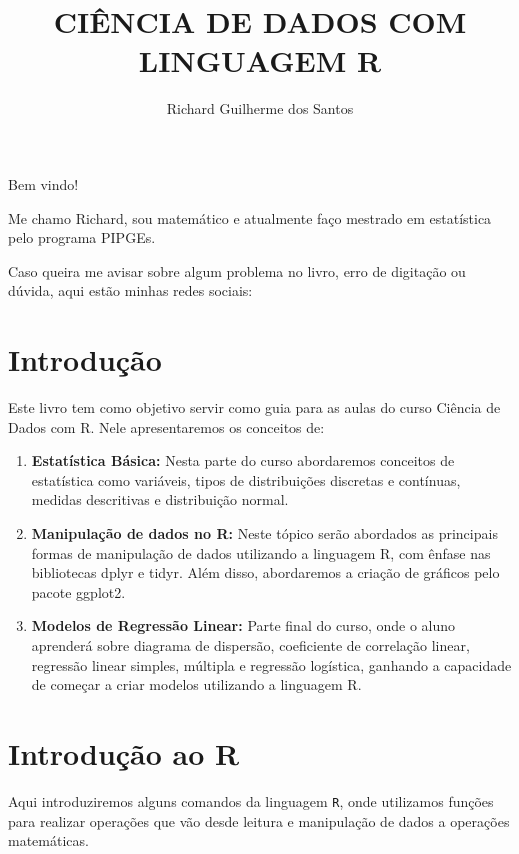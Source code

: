 \documentclass[
]{book}
\title{CIÊNCIA DE DADOS COM LINGUAGEM R}
\author{Richard Guilherme dos Santos}
\date{}
\providecommand{\tightlist}{%
  \setlength{\itemsep}{0pt}\setlength{\parskip}{0pt}}
\begin{document}
\maketitle

{
\setcounter{tocdepth}{1}
\tableofcontents
}
Bem vindo!

Me chamo Richard, sou matemático e atualmente faço mestrado em estatística
pelo programa PIPGEs.

Caso queira me avisar sobre algum problema no livro, erro de digitação ou
dúvida, aqui estão minhas redes sociais:

\hypertarget{introduuxe7uxe3o}{%
\chapter{Introdução}\label{introduuxe7uxe3o}}

Este livro tem como objetivo servir como guia para as aulas do curso Ciência de Dados com R. Nele apresentaremos os conceitos de:

\begin{enumerate}
\def\labelenumi{\arabic{enumi}.}
\tightlist
\item
  \textbf{Estatística Básica:} Nesta parte do curso abordaremos conceitos de estatística como variáveis, tipos de distribuições discretas e contínuas, medidas descritivas e distribuição normal.
\item
  \textbf{Manipulação de dados no R:} Neste tópico serão abordados as principais formas de manipulação de dados utilizando a linguagem R, com ênfase nas bibliotecas dplyr e tidyr. Além disso, abordaremos a criação de gráficos pelo pacote ggplot2.
\item
  \textbf{Modelos de Regressão Linear:} Parte final do curso, onde o aluno aprenderá sobre diagrama de dispersão, coeficiente de correlação linear, regressão linear simples, múltipla e regressão logística, ganhando a capacidade de começar a criar modelos utilizando a linguagem R.
\end{enumerate}

\hypertarget{introduuxe7uxe3o-ao-r}{%
\chapter{Introdução ao R}\label{introduuxe7uxe3o-ao-r}}

Aqui introduziremos alguns comandos da linguagem \texttt{R}, onde utilizamos funções para realizar operações que vão desde leitura e manipulação de dados a operações matemáticas.
\end{document}
